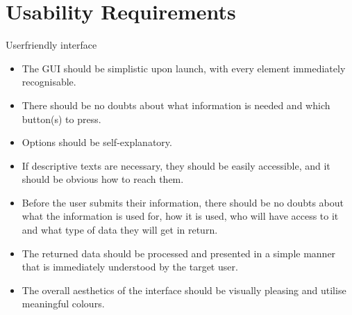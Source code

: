 \section{Usability Requirements}
\begin{requirement}{Userfriendly interface} 
\begin{itemize}
  \item The \ac{GUI} should be simplistic upon launch, with every element
  immediately recognisable.
  \item There should be no doubts about what information is needed and which
  button(s) to press.
  \item Options should be self-explanatory.
  \item If descriptive texts are necessary, they should be easily accessible,
  and it should be obvious how to reach them.
  \item Before the user submits their information, there should be no doubts
  about what the information is used for, how it is used, who will have access
  to it and what type of data they will get in return.
  \item The returned data should be processed and presented in a simple manner
  that is immediately understood by the target user.
  \item The overall aesthetics of the interface should be visually pleasing and
  utilise meaningful colours.
\end{itemize}
\end{requirement}